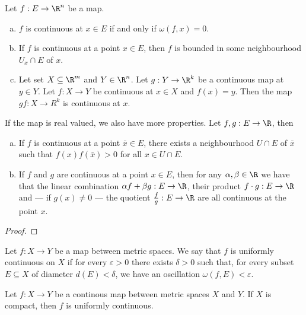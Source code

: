 \begin{proposition}
Let \(f: E \to \R^n\) be a map.
\begin{enumerate}[(a)]
\item \(f\) is continuous at \(x \in E\) if and only if \(\omega(f, x) =
    0\).
\item If \(f\) is continuous at a point \(x \in E\), then \(f\) is bounded
    in some neighbourhood \(U_x \cap E\) of \(x\).
\item Let set \(X \subseteq \R^m\) and \(Y \in \R^n\). Let \(g: Y \to \R^k\)
    be a continuous map at \(y \in Y\). Let \(f: X \to Y\) be continuous at
    \(x \in X\) and \(f(x) = y\). Then the map \(g  f: X \to R^k\) is
    continuous at \(x\).
\end{enumerate}
If the map is real valued, we also have more properties. Let \(f, g: E \to
\R\), then
\begin{enumerate}[(a)]
\item If \(f\) is continuous at a point \(\bar x \in E\), there exists a
    neighbourhood \(U \cap E\) of \(\bar x\) such that \(f(x)f(\bar x) > 0\)
    for all \(x \in U \cap E\).
\item If \(f\) and \(g\) are continuous at a point \(x \in E\), then for any
    \(\alpha, \beta \in \R\) we have that the linear combination \(\alpha f +
    \beta g: E \to \R\), their product \(f \cdot g: E \to \R\) and --- if \(g(x)
    \neq 0\) --- the quotient \(\frac f g: E \to \R\) are all continuous at
    the point \(x\).
\end{enumerate}
\end{proposition}

\begin{proof}
\end{proof}

\begin{definition}\label{def:uniformly-continuous}
Let \(f: X \to Y\) be a map between metric spaces. We say that \(f\) is
uniformly continuous on \(X\) if for every \(\varepsilon > 0\) there exists
\(\delta > 0\) such that, for every subset \(E \subseteq X\) of diameter \(d(E)
< \delta\), we have an oscillation \(\omega(f, E) < \varepsilon\).
\end{definition}

\begin{theorem}
\label{thm:heine-cantor}
Let \(f: X \to Y\) be a continous map between metric spaces \(X\) and \(Y\). If
\(X\) is compact, then \(f\) is uniformly continuous.
\end{theorem}

